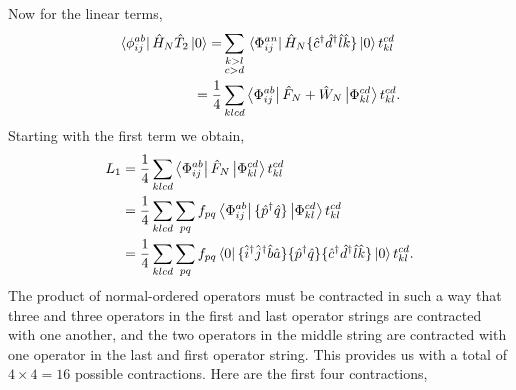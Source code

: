 Now for the linear terms,
\begin{equation}
    \begin{aligned}
        \bra*{\phi^{ab}_{ij}} \hat{H}_N \hat{T}_2 \ket{0} 
            = &\sum_{\substack{k>l \\ c>d}} \bra*{\Phi^{an}_{ij}} \hat{H}_N
                \{\hat{c}^\dagger \hat{d}^\dagger \hat{l} \hat{k} \} \ket{0}t^{cd}_{kl} \\
            = \frac{1}{4} &\sum_{klcd} \bra{\Phi^{ab}_{ij}} \hat{F}_N + \hat{W}_N\ket{\Phi^{cd}_{kl}}t^{cd}_{kl}.
    \end{aligned}
\end{equation}
Starting with the first term we obtain,
\begin{equation}
    \begin{aligned}
        \label{eq:ccd_first_linear_term}
        L_1 &= \frac{1}{4}\sum_{klcd} \bra{\Phi^{ab}_{ij}} \hat{F}_N \ket{\Phi^{cd}_{kl}} t^{cd}_{kl} \\
            &= \frac{1}{4}\sum_{klcd} \sum_{pq} f_{pq} \bra{\Phi^{ab}_{ij}}
                \{ \hat{p}^\dagger \hat{q}\} \ket{\Phi^{cd}_{kl}} t^{cd}_{kl} \\
            &= \frac{1}{4} \sum_{klcd}\sum_{pq} f_{pq} \bra{0}
                \{\hat{i}^\dagger \hat{j}^\dagger \hat{b} \hat{a} \}
                \{\hat{p}^\dagger \hat{q}\} 
                \{\hat{c}^\dagger \hat{d}^\dagger \hat{l} \hat{k} \}
            \ket{0} t^{cd}_{kl}.
    \end{aligned}
\end{equation}
The product of normal-ordered operators must be contracted in such a way that three and
three operators in the first and last operator strings are contracted with one another,
and the two operators in the middle string are contracted with one operator in the last
and first operator string. This provides us with a total of $4 \times 4 = 16$
possible contractions. Here are the first four contractions,
